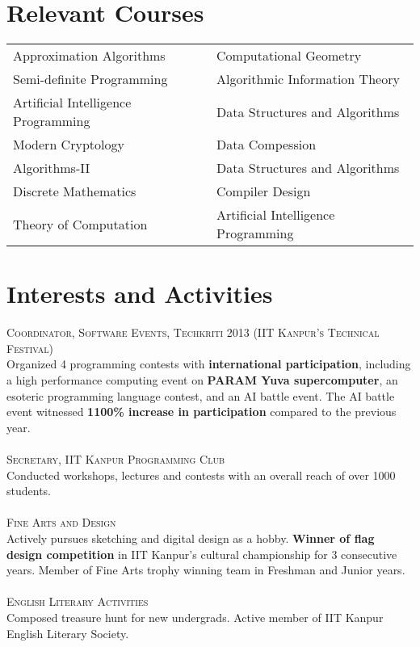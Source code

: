 \documentclass[a4paper,10pt]{article}
\begin{document}
\section{Relevant Courses}
\begin{tabular}{ll}
Approximation Algorithms & Computational Geometry\\
Semi-definite Programming & Algorithmic Information Theory\\
Artificial Intelligence Programming & Data Structures and Algorithms\\
Modern Cryptology & Data Compession\\
Algorithms-II & Data Structures and Algorithms\\
Discrete Mathematics & Compiler Design\\
Theory of Computation & Artificial Intelligence Programming
\end{tabular}

\section{Interests and Activities}
\textsc{Coordinator, Software Events, Techkriti 2013 (IIT Kanpur's Technical Festival)}\\
{\small Organized 4 programming contests with \textbf{international participation}, including a high performance computing event on \textbf{PARAM Yuva supercomputer}, an esoteric programming language contest, and an AI battle event. The AI battle event witnessed \textbf{1100\% increase in participation} compared to the previous year.}\\\\
\textsc{Secretary, IIT Kanpur Programming Club}\\
{\small Conducted workshops, lectures and contests with an overall reach of over 1000 students.}\\\\
\textsc{Fine Arts and Design}\\
{\small Actively pursues sketching and digital design as a hobby. \textbf{Winner of flag design competition} in IIT Kanpur's cultural championship for 3 consecutive years. Member of Fine Arts trophy winning team in Freshman and Junior years.}\\\\
\textsc{English Literary Activities}\\
{\small Composed treasure hunt for new undergrads. Active member of IIT Kanpur English Literary Society}.
\end{document}
